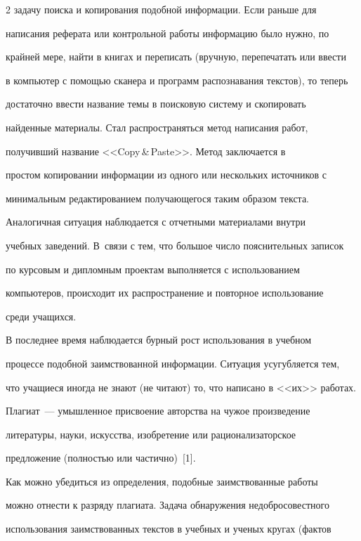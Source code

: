 \begin{multicols}{2}
задачу поиска и копирования подобной информации. Если раньше для 

написания реферата или контрольной работы информацию было нужно, по 

крайней мере, найти в книгах и переписать (вручную, перепечатать или ввести 

в компьютер с помощью сканера и программ распознавания текстов), то теперь 

достаточно ввести название темы в поисковую сис\-те\-му и скопировать 

найденные материалы. Стал распространяться метод написания работ, 

получивший название <<{Copy}\,\&\,{Paste}>>. Метод заключается в 

простом копировании информации из одного или нескольких источников с 

минимальным редактированием получающегося таким образом текста. 

  

  Аналогичная ситуация наблюдается с отчетными материалами внутри 

учебных заведений. В~связи с тем, что большое число пояснительных записок 

по курсовым и дипломным проектам выполняется с использованием 

компьютеров, происходит их распространение и повторное использование 

среди учащихся.

  

  В последнее время наблюдается бурный рост использования в учебном 

процессе подобной заимствованной информации. Ситуация усугубляется тем, 

что учащиеся иногда не знают (не читают) то, что написано в <<их>> работах. 

  

  Плагиат~--- умышленное присвоение авторства на чужое произведение 

литературы, науки, искусства, изобретение или рационализаторское 

предложение (полностью или частично)~[1].

  

  Как можно убедиться из определения, подобные заимствованные работы 

можно отнести к разряду плагиата. Задача обнаружения недобросовестного 

использования заимствованных текстов в учебных и ученых кругах (фактов 


\end{multicols}
